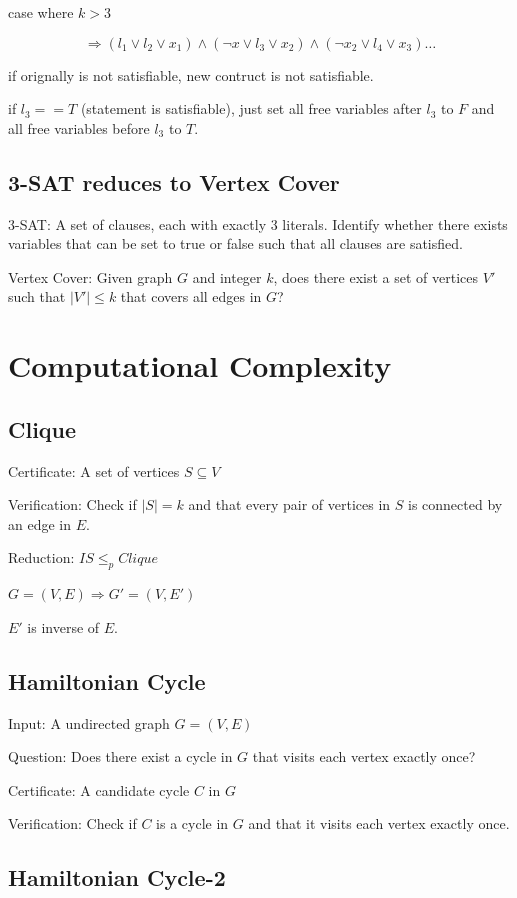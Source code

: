 \documentclass[12pt,a4paper]{article}
\begin{document}
case where $ k>3$

\[ \Rightarrow (l_1 \lor l_2 \lor x_1) \land (\neg x \lor l_3 \lor x_2) \land (\neg x_2 \lor l_4 \lor x_3)\dots\]

if orignally is not satisfiable, new contruct is not satisfiable.

if $l_3 == T$ (statement is satisfiable), just set all free variables after $l_3$ to $F$ and all free variables before $l_3$ to $T$.

\subsection*{3-SAT reduces to Vertex Cover}

3-SAT: A set of clauses, each with exactly 3 literals. Identify whether there exists variables that can be set to true or false such that all clauses are satisfied.

Vertex Cover: Given graph $G$ and integer $k$, does there exist a set of vertices $V'$ such that $|V'| \leq k$ that covers all edges in $G$? 

\section*{Computational Complexity}

\subsection*{Clique}

Certificate: A set of vertices $S \subseteq V$ 

Verification: Check if $|S| = k$ and that every pair of vertices in $S$ is connected by an edge in $E$.

Reduction: $IS \leq_p Clique$

$G = (V, E) \Rightarrow G' = (V, E')$

$E'$ is inverse of $E$.

\subsection*{Hamiltonian Cycle}

Input: A undirected graph $G = (V, E)$

Question: Does there exist a cycle in $G$ that visits each vertex exactly once?

Certificate: A candidate cycle $C$ in $G$

Verification: Check if $C$ is a cycle in $G$ and that it visits each vertex exactly once.

\subsection*{Hamiltonian Cycle-2}
\end{document}
